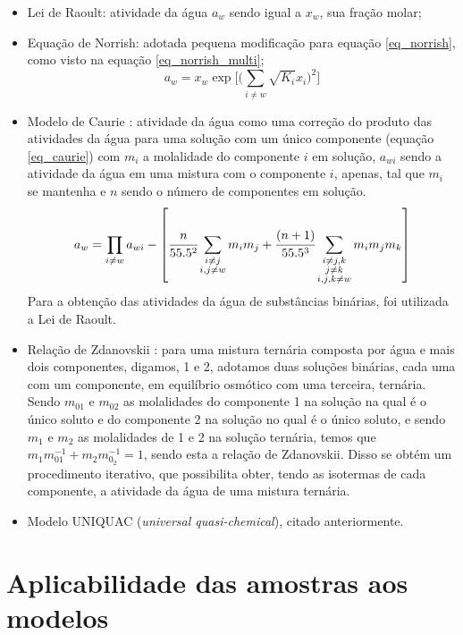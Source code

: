 \documentclass[
	12pt,				%
	openright,
	twoside,
	a4paper,			%
	english,			%
	french,				%
	spanish,			%
	brazil				%
	]{abntex2}
\begin{document}
\begin{itemize}
	\item Lei de Raoult: atividade da água $a_w$ sendo igual a $x_w$,
		sua fração molar;
	\item Equação de Norrish: adotada pequena modificação para equação
		\ref{eq_norrish}, como visto na equação \ref{eq_norrish_multi};
		\begin{equation}
			\label{eq_norrish_multi}
			a_w = x_w\exp\Big[\Big(\sum_{i \neq w}%
			\sqrt{K_i}x_i\Big)^2\Big]
		\end{equation}
	\item Modelo de Caurie \cite{caurie1986}: atividade da água como uma
		correção do produto das atividades da água para uma solução
		com um único componente (equação \ref{eq_caurie}) com
		$m_i$ a molalidade do componente $i$ em solução, $a_{wi}$
		sendo a atividade da água em uma mistura com o componente
		$i$, apenas, tal que $m_i$ se mantenha e $n$ sendo o número de
		componentes em solução.
		\begin{equation}
			\label{eq_caurie}
			a_w = \prod_{i \neq w}a_{wi}-\left[\cfrac{n}%
			{55.5^2}\sum_{\substack{i \neq j \\ i,j \neq w}}%
			m_im_j + \cfrac{(n+1)}{55.5^3}\sum_{%
			\substack{i\neq j,k \\ j \neq k \\  i,j,k \neq w}}%
			m_im_jm_k\right]
		\end{equation}
		Para a obtenção das atividades da água de substâncias
		binárias, foi utilizada a Lei de Raoult.
	\item Relação de Zdanovskii \cite{chen1973,sangster1973}:
		para uma mistura ternária composta por água e mais dois
		componentes, digamos, 1 e 2, adotamos duas soluções binárias,
		cada uma com um componente, em equilíbrio osmótico com uma
		terceira, ternária. Sendo $m_{01}$ e $m_{02}$ as
		molalidades do componente 1 na solução na qual é o único
		soluto e do componente 2 na solução no qual é o único soluto, e
		sendo $m_1$ e $m_2$ as molalidades de 1 e 2 na solução ternária,
		temos que $m_1m_{01}^{-1} + m_2m_{0_2}^{-1} = 1$, sendo esta a
		relação de Zdanovskii. Disso se obtém um procedimento iterativo,
		que possibilita obter, tendo as isotermas de cada componente, a
		atividade da água de uma mistura ternária.
	\item Modelo UNIQUAC (\textit{universal quasi-chemical}), citado
		anteriormente.
\end{itemize}

\section{Aplicabilidade das amostras aos modelos}
\end{document}
